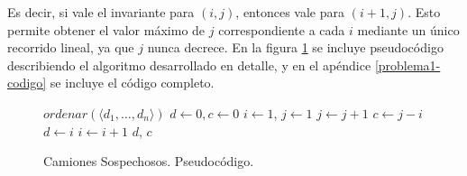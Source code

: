 Es decir, si vale el invariante para $(i,j)$, entonces vale para $(i+1,j)$. Esto permite obtener el valor máximo de $j$ correspondiente a cada $i$ mediante un único recorrido lineal, ya que $j$ nunca decrece. En la figura \ref{problema1-pseudo} se incluye pseudocódigo describiendo el algoritmo desarrollado en detalle, y en el apéndice \ref{problema1-codigo} se incluye el código completo.

\begin{center}
\begin{figure}[H]
    \begin{pseudo}
            \State $ordenar(\langle d_1, \ldots, d_n \rangle)$ 
            \State $d \leftarrow 0, c \leftarrow 0$ 
            \State $i \leftarrow 1$, $j \leftarrow 1$ 
             
                 
                     
                        \State $j \leftarrow j + 1$ 
                    \EndWhile
                     
                        \State $c \leftarrow j - i$ 
                        \State $d \leftarrow i$ 
                    \EndIf
                \EndIf
                \State $i \leftarrow i + 1$ 
            \EndWhile
            \Return $d$, $c$
        \EndProcedure
    \end{pseudo}
    \caption{Camiones Sospechosos. Pseudocódigo.}
    \label{problema1-pseudo}
\end{figure}
\end{center}

